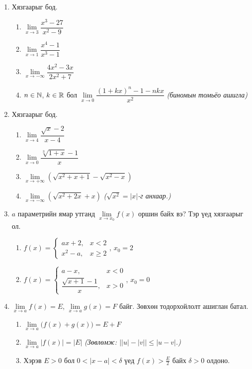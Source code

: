 \begin{enumerate}
\item Хязгаарыг бод.
  \begin{enumerate}[label=\roman*)]
  \item $\lim\limits_{x\to3}\dfrac{x^3-27}{x^2-9}$
  \item $\lim\limits_{x\to1}\dfrac{x^4-1}{x^3-1}$
  \item $\lim\limits_{x\to-\infty}\dfrac{4x^2-3x}{2x^2+7}$
  \item $n\in\mathbb{N}$, $k\in\mathbb{R}$ бол $\lim\limits_{x\to0}\dfrac{(1+kx)^n-1-nkx}{x^2}$ \quad \textit{(биномын томьёо ашигла)}
  \end{enumerate}

\item Хязгаарыг бод.
  \begin{enumerate}[label=\roman*)]
  \item $\lim\limits_{x\to4}\dfrac{\sqrt x-2}{x-4}$
  \item $\lim\limits_{x\to0}\dfrac{\sqrt[3]{1+x}-1}{x}$
  \item $\lim\limits_{x\to+\infty}\left(\sqrt{x^2+x+1}-\sqrt{x^2-x}\right)$
  \item $\lim\limits_{x\to-\infty}\left(\sqrt{x^2+2x}+x\right)$ \quad \textit{($\sqrt{x^2}=|x|$-г анхаар.)}
  \end{enumerate}

\item $a$ параметрийн ямар утганд $\lim\limits_{x\to x_0}f(x)$ оршин байх вэ? Тэр үед хязгаарыг ол.
  \begin{enumerate}[label=\roman*)]
  \item $f(x)=\begin{cases}ax+2, & x<2\\ x^2-a, & x\ge2\end{cases}$, \quad $x_0=2$
  \item $f(x)=\begin{cases}a-x, & x<0\\ \dfrac{\sqrt{x+1}-1}{x}, & x>0\end{cases}$, \quad $x_0=0$
  \end{enumerate}

\item $\lim\limits_{x\to a}f(x)=E$, $\lim\limits_{x\to a}g(x)=F$ байг. Зөвхөн тодорхойлолт ашиглан батал.
  \begin{enumerate}[label=\roman*)]
  \item $\lim\limits_{x\to a}\bigl(f(x)+g(x)\bigr)=E+F$
  \item $\lim\limits_{x\to a}|f(x)|=|E|$ \quad \textit{(Зөвлөмж: $\bigl||u|-|v|\bigr|\le|u-v|$.)}
  \item Хэрэв $E>0$ бол $0<|x-a|<\delta$ үед $f(x)>\frac E2$ байх $\delta>0$ олдоно.
  \end{enumerate}


\end{enumerate}
